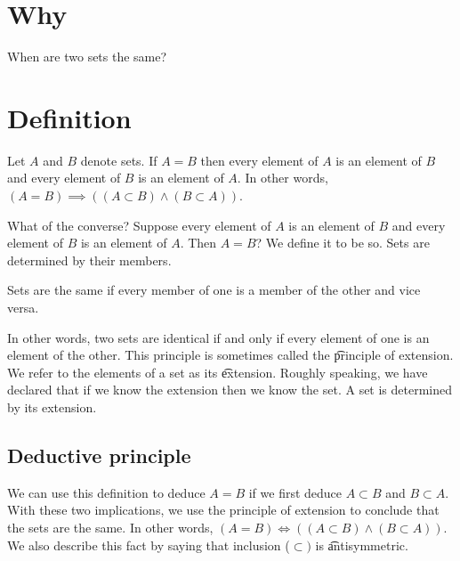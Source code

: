 
\section*{Why}

When are two sets the same?

\section*{Definition}

Let $A$ and $B$ denote sets.
If $A = B$ then every element of $A$ is an element of $B$ and every element of $B$ is an element of $A$.
In other words, $(A = B) \implies ((A \subset B) \land (B \subset A))$.


What of the converse?
Suppose every element of $A$ is an element of $B$ and every element of $B$ is an element of $A$.
Then $A = B$?
We define it to be so.
Sets are determined by their members.

\begin{principle}[Extension]
Sets are the same if every member of one is a member of the other and vice versa.
\end{principle}

In other words, two sets are identical if and only if every element of one is an element of the other.
This principle is sometimes called the \t{principle of extension}.
We refer to the elements of a set as its \t{extension}.
Roughly speaking, we have declared that if we know the extension then we know the set.
A set is determined by its extension.

\subsection*{Deductive principle}

We can use this definition to deduce $A= B$ if we first deduce $A \subset B$ and $B \subset A$.
With these two implications, we use the principle of extension to conclude that the sets are the same.
In other words, $(A = B) \iff ((A \subset B) \land (B \subset A))$.
We also describe this fact by saying that inclusion ($\subset)$ is \t{antisymmetric}.

